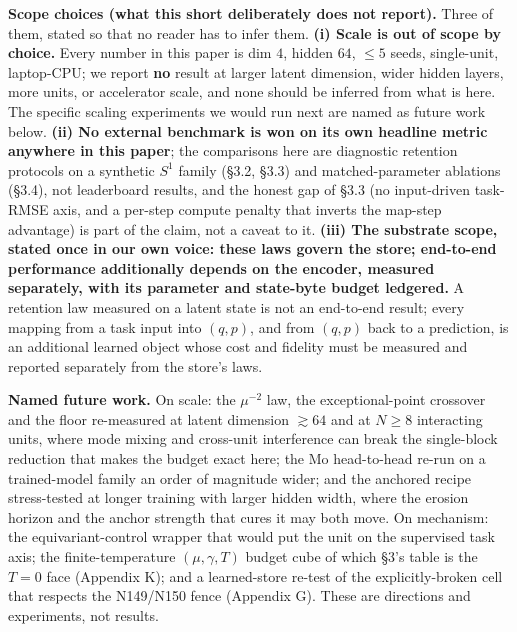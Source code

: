 \documentclass[10pt]{article}
\begin{document}
\textbf{Scope choices (what this short deliberately does not report).} Three of them, stated so that no reader has to infer them. \textbf{(i) Scale is out of scope by choice.} Every number in this paper is dim $4$, hidden $64$, $\le5$ seeds, single-unit, laptop-CPU; we report \textbf{no} result at larger latent dimension, wider hidden layers, more units, or accelerator scale, and none should be inferred from what is here. The specific scaling experiments we would run next are named as future work below. \textbf{(ii) No external benchmark is won on its own headline metric anywhere in this paper}; the comparisons here are diagnostic retention protocols on a synthetic $S^1$ family (\S3.2, \S3.3) and matched-parameter ablations (\S3.4), not leaderboard results, and the honest gap of \S3.3 (no input-driven task-RMSE axis, and a per-step compute penalty that inverts the map-step advantage) is part of the claim, not a caveat to it. \textbf{(iii) The substrate scope, stated once in our own voice: these laws govern the store; end-to-end performance additionally depends on the encoder, measured separately, with its parameter and state-byte budget ledgered.} A retention law measured on a latent state is not an end-to-end result; every mapping from a task input into $(q,p)$, and from $(q,p)$ back to a prediction, is an additional learned object whose cost and fidelity must be measured and reported separately from the store's laws.

\textbf{Named future work.} On scale: the $\mu^{-2}$ law, the exceptional-point crossover and the floor re-measured at latent dimension $\gtrsim64$ and at $N\ge8$ interacting units, where mode mixing and cross-unit interference can break the single-block reduction that makes the budget exact here; the Mo head-to-head re-run on a trained-model family an order of magnitude wider; and the anchored recipe stress-tested at longer training with larger hidden width, where the erosion horizon and the anchor strength that cures it may both move. On mechanism: the equivariant-control wrapper that would put the unit on the supervised task axis; the finite-temperature $(\mu,\gamma,T)$ budget cube of which \S3's table is the $T=0$ face (Appendix K); and a learned-store re-test of the explicitly-broken cell that respects the N149/N150 fence (Appendix G). These are directions and experiments, not results.
\end{document}

